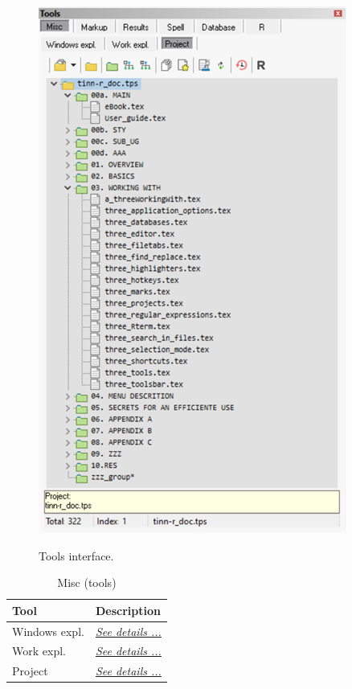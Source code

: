 \begin{figure}[H]
  \includegraphics[scale=0.35]{./res/tools_misc_project.png}\\
  \caption{Tools interface.}
  \label{fig:tools_misc_options}
\end{figure}

\begin{table}[H]
  \begin{footnotesize}
    \begin{tabularx}{\textwidth}{>{\hsize=0.3\hsize}X>{\hsize=0.7\hsize}X}\\
      \hline
      \textbf{Tool} & \textbf{Description} \\
      \hline
      Windows expl. & \textit{\href{\#working\_tools\_misc\_windowsexpl}{See details ...}} \\
      Work expl. & \textit{\href{\#working\_tools\_misc\_workexpl}{See details ...}} \\
      Project & \textit{\href{\#working\_tools\_misc\_project}{See details ...}} \\
      \hline
    \end{tabularx}
  \end{footnotesize}
  \caption{Misc (tools)}
  \label{tab:tools_misc}
\end{table}

